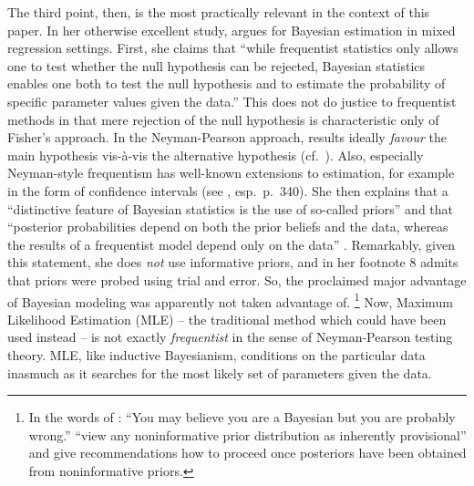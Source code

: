\documentclass[USenglish]{article}
\begin{document}
The third point, then, is the most practically relevant in the context of this paper.
In her otherwise excellent study, \citet[251--252]{Levshina2016} argues for Bayesian estimation in mixed regression settings.
First, she claims that ``while frequentist statistics only allows one to test whether the null hypothesis can be rejected, Bayesian statistics enables one both to test the null hypothesis and to estimate the probability of specific parameter values given the data.''
This does not do justice to frequentist methods in that mere rejection of the null hypothesis is characteristic only of Fisher's approach.
In the Neyman-Pearson approach, results ideally \textit{favour} the main hypothesis vis-à-vis the alternative hypothesis (cf.\ \citealp{Lehmann1993,Lehmann2011,Perezgonzalez2015}).
Also, especially Neyman-style frequentism has well-known extensions to estimation, for example in the form of confidence intervals (see \citealp{GreenlandEa2016}, esp.\ p.\ 340).
She then explains that a ``distinctive feature of Bayesian statistics is the use of so-called priors'' and that ``posterior probabilities depend on both the prior beliefs and the data, whereas the results of a frequentist model depend only on the data'' \cite[252]{Levshina2016}.
Remarkably, given this statement, she does \textit{not} use informative priors, and in her footnote 8 \cite[252]{Levshina2016} admits that priors were probed using trial and error.
So, the proclaimed major advantage of Bayesian modeling was apparently not taken advantage of.%
\footnote{In the words of \cite{Senn2011}: ``You may believe you are a Bayesian but you are probably wrong.''
\citet[347--348]{GelmanHill2006} ``view any noninformative prior distribution as inherently provisional'' and give recommendations how to proceed once posteriors have been obtained from noninformative priors.}
Now, Maximum Likelihood Estimation (MLE) -- the traditional method which could have been used instead -- is not exactly \textit{frequentist} in the sense of Neyman-Pearson testing theory.
MLE, like inductive Bayesianism, conditions on the particular data inasmuch as it searches for the most likely set of parameters given the data.
\end{document}
